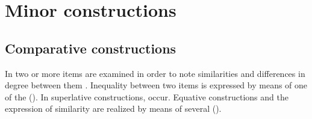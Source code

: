 \chapter{Minor constructions}
\label{cpt:Minor constructions}



\section{Comparative constructions}
\label{sec:Comparative constructions}

In  two or more items are examined in order to note similarities and differences in degree between them \citep[787]{Dixon2008}. Inequality between two items is expressed by means of one of the  (). In superlative constructions,  occur. Equative constructions and the expression of similarity are realized by means of several  ().

